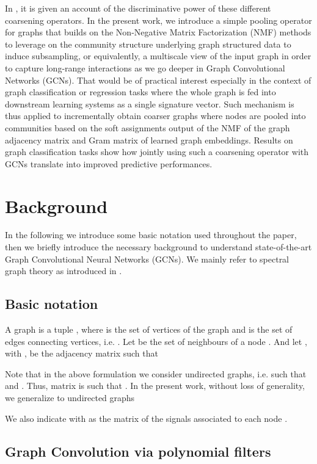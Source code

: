 \documentclass[runningheads]{llncs}
\begin{document}
In \cite{DBLP:journals/corr/abs-1810-00826}, it is given an account of the discriminative power of these different coarsening operators. In the present work, we introduce a simple pooling operator for graphs that builds on the Non-Negative Matrix Factorization (NMF) methods to leverage on the community structure underlying graph structured data to induce subsampling, or equivalently, a multiscale view of the input graph in order to capture long-range interactions as we go deeper in Graph Convolutional Networks (GCNs).
That would be of practical interest especially in the context of graph classification or regression tasks where the whole graph is fed into downstream learning systems as a single signature vector.
Such mechanism is thus applied to incrementally obtain coarser graphs where nodes are pooled into communities based on the soft assignments output of the NMF of the graph adjacency matrix and Gram matrix of learned graph embeddings.
Results on graph classification tasks show how jointly using such a coarsening operator with GCNs translate into improved predictive performances.

\section{Background}

In the following we introduce some basic notation used throughout the paper, then we briefly introduce the necessary background to understand state-of-the-art Graph Convolutional Neural Networks (GCNs). We mainly refer to spectral graph theory as introduced in \cite{Belkin:2001:LES:2980539.2980616,DBLP:journals/corr/BronsteinBLSV16,bruna}.

\subsection{Basic notation} A graph  is a tuple , where  is the set of vertices of the graph and  is the set of edges connecting vertices, i.e. . Let  be the set of neighbours of a node . And let , with , be the adjacency matrix such that


Note that in the above formulation we consider undirected graphs, i.e. such that  and . Thus, matrix  is such that . In the present work, without loss of generality, we generalize to undirected graphs


We also indicate with  as the matrix of the  signals  associated to each node . 

\subsection{Graph Convolution via polynomial filters}
\end{document}
